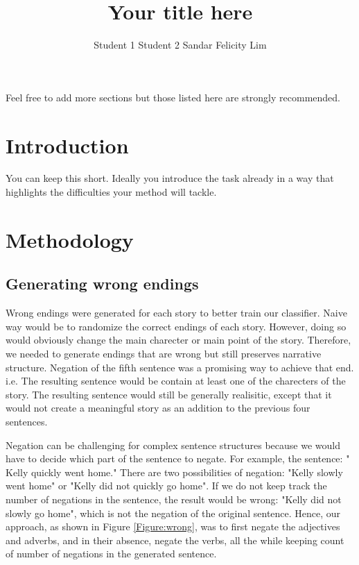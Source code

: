 \documentclass{article}
\title{Your title here}
\author{Student 1 \qquad Student 2 \qquad Sandar Felicity Lim}
\begin{document}

\maketitle


Feel free to add more sections but those listed here are strongly recommended.
\section{Introduction}
You can keep this short. Ideally you introduce the task already in a way that highlights the difficulties  your method will tackle.

\section{Methodology}
\subsection{Generating wrong endings}
Wrong endings were generated for each story to better train our classifier. Naive way would be to randomize the correct endings of each story. However, doing so would obviously change the main charecter or main point of the story. Therefore, we needed to generate endings that are wrong but still preserves narrative structure. Negation of the fifth sentence was a promising way to achieve that end. i.e. The resulting sentence would be contain at least one of the charecters of the story. The resulting sentence would still be generally realisitic, except that it would not create a meaningful story as an addition to the previous four sentences.


Negation can be challenging for complex sentence structures because we would have to decide which part of the sentence to negate. For example, the sentence: "
Kelly quickly went home." There are two possibilities of negation: "Kelly slowly went home" or "Kelly did not quickly go home". If we do not keep track the number of negations in the sentence, the result would be wrong: "Kelly did not slowly go home", which is not the negation of the original sentence. Hence, our approach, as shown in  Figure \ref{Figure:wrong}, was to first negate the adjectives and adverbs, and in their absence, negate the verbs, all the while keeping count of number of negations in the generated sentence.
\end{document}
